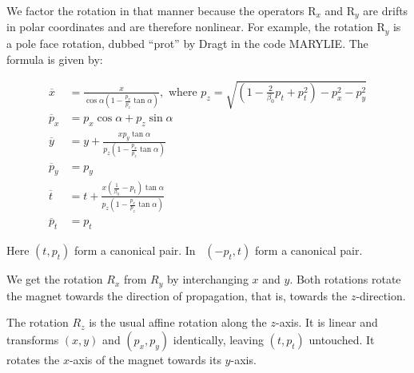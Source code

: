 We factor the rotation in that manner because the operators R$_{x}$
and R$_{y}$ are drifts in polar coordinates and are therefore nonlinear.
For example, the rotation R$_{y}$ is a pole face rotation, dubbed
``prot'' by Dragt in the code MARYLIE. The formula is given by:

\begin{align*}
  \overline{x} &=
    \frac{x}{\cos\alpha\left(1-\frac{p_x}{p_z}\tan\alpha\right)},
    \text{ where }
    p_z = \sqrt{\left(1-\frac{2}{\beta_0}p_t + p_t^2\right)
                - p_x^2 - p_y^2} \\
  \overline{p}_x &= p_x\cos\alpha + p_z\sin\alpha \\
  \overline{y} &= y
    + \frac{x p_y\tan\alpha}%
           {p_z\left(1-\frac{p_x}{p_z}\tan\alpha\right)} \\
  \overline{p}_y &= p_y\\
  \overline{t} &=  t
    + \frac{x\left(\frac{1}{\beta_0}-p_t\right)\tan\alpha}%
           {p_z\left(1-\frac{p_x}{p_z}\tan\alpha\right)} \\
  \overline{p}_t &= p_t
\end{align*}

Here $(t,p_t)$ form a canonical pair.  In \PTC\ $(-p_t,t)$ form a canonical pair.

We get the rotation $R_x$ from $R_y$ by interchanging $x$ and $y$. Both
rotations rotate the magnet towards the direction of propagation, that is,
towards the $z$-direction.

The rotation $R_z$ is the usual affine rotation along the $z$-axis.
It is linear and transforms $(x,y)$ and $(p_x,p_y)$ identically,
leaving $(t,p_t)$ untouched.  It rotates the $x$-axis of the magnet
towards its $y$-axis.

